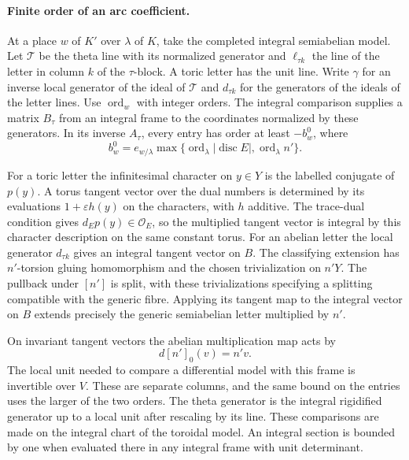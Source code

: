 

\paragraph{Finite order of an arc coefficient.}
At a place \(w\) of \(K'\) over \(\lambda\) of \(K\), take
the completed integral semiabelian model. Let
\(\mathcal T\) be the theta line with its normalized generator
and \(\ell_{\tau k}\) the line of the letter in column \(k\)
of the \(\tau\)-block. A toric letter has the unit line.
Write \(\gamma\) for an inverse local generator of the ideal of \(\mathcal T\)
and \(d_{\tau k}\) for the generators of the ideals of the
letter lines. Use \(\operatorname{ord}_w\) with integer orders.
The integral comparison supplies a matrix \(B_\tau\) from
an integral frame to the coordinates normalized by these
generators. In its inverse \(A_\tau\), every entry has order
at least \(-b_w^0\), where
\[
 b_w^0=e_{w/\lambda}
             \max\{\operatorname{ord}_\lambda|\operatorname{disc}E|,
                         \operatorname{ord}_\lambda n'\}.
\]

For a toric letter the infinitesimal character on \(y\in Y\)
is the labelled conjugate of \(p(y)\). A torus tangent vector
over the dual numbers is determined by its evaluations
\(1+\varepsilon h(y)\) on the characters, with \(h\) additive.
The trace-dual condition gives \(d_Ep(y)\in\mathcal O_E\),
so the multiplied tangent vector is integral by this
character description on the same constant torus. For an
abelian letter the local generator \(d_{\tau k}\) gives an
integral tangent vector on \(B\). The classifying extension
has \(n'\)-torsion gluing homomorphism and the chosen
trivialization on \(n'Y\). The pullback under \([n']\) is split,
with these trivializations specifying a splitting compatible
with the generic fibre. Applying its tangent map to the
integral vector on \(B\) extends precisely the generic
semiabelian letter multiplied by \(n'\).

On invariant tangent vectors the abelian multiplication map acts by
\[
  d[n']_0(v)=n'v .
\]
 The local unit
needed to compare a differential model with this frame
is invertible over \(V\). These are separate columns, and
the same bound on the entries uses the larger of the two
orders. The theta generator is the integral rigidified
generator up to a local unit after rescaling by its line.
These comparisons are made on the integral chart of the
toroidal model. An integral section is bounded by one when
evaluated there in any integral frame with unit determinant.
\label{cor:slice-cm-coefficients-4}

